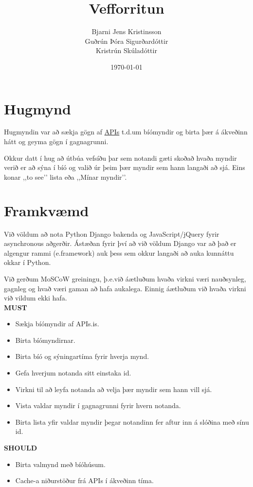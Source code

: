 \documentclass[a4paper,oneside]{article}
\title{Vefforritun}
\date{\today}
\author{Bjarni Jens Kristinsson \\ Guðrún Þóra Sigurðardóttir \\ Kristrún Skúladóttir}
\begin{document}
\maketitle

\section{Hugmynd}
Hugmyndin var að sækja gögn af \href{http://docs.apis.is/}{APIs} t.d.\@ um bíómyndir
og birta þær á ákveðinn hátt og geyma gögn í gagnagrunni.

Okkur datt í hug að útbúa vefsíðu þar sem notandi gæti skoðað hvaða myndir verið er
að sýna í bíó og valið úr þeim þær myndir sem hann langaði að sjá. Eins konar ,,to see’’
lista eða ,,Mínar myndir’’.

\section{Framkvæmd}
Við völdum að nota Python Django bakenda og JavaScript/jQuery fyrir asynchronous aðgerðir.
Ástæðan fyrir því að við völdum Django var að það er algengur rammi (e.\@ framework) auk þess
sem okkur langaði að auka kunnáttu okkar í Python.

Við gerðum MoSCoW greiningu, þ.e.\@ við áætluðum hvaða virkni væri nauðsynleg, gagnleg og
hvað væri gaman að hafa aukalega. Einnig áætluðum við hvaða virkni við vildum ekki hafa. \\

\noindent\textbf{MUST}
\begin{itemize} 
    \item Sækja bíómyndir af APIs.is.
    \item Birta bíómyndirnar.
    \item Birta bíó og sýningartíma fyrir hverja mynd.
    \item Gefa hverjum notanda sitt einstaka id.
    \item Virkni til að leyfa notanda að velja þær myndir sem hann vill sjá.
    \item Vista valdar myndir í gagnagrunni fyrir hvern notanda.
    \item Birta lista yfir valdar myndir þegar notandinn fer aftur inn á slóðina með sínu id.
\end{itemize}

\noindent\textbf{SHOULD}
\begin{itemize} 
    \item Birta valmynd með bíóhúsum.
    \item Cache-a niðurstöður frá APIs í ákveðinn tíma.
\end{itemize}
\end{document}
